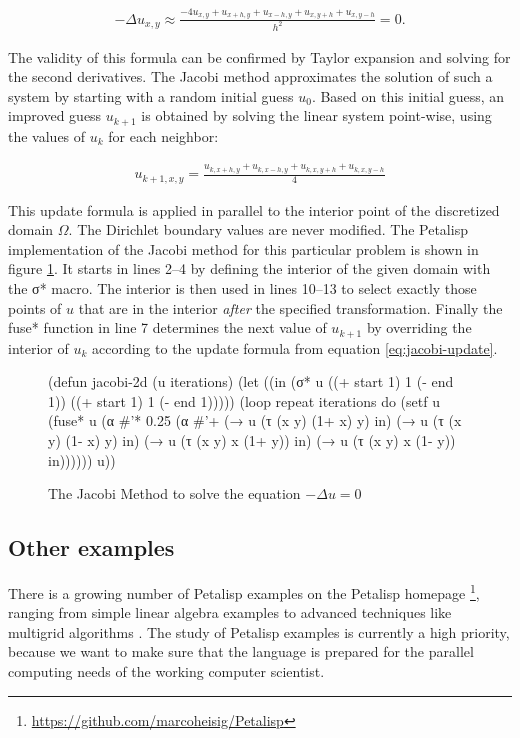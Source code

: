 \begin{align}
\label{eq:discretized-laplace}
- \Delta u_{x,y} \approx \frac{-4 u_{x,y} + u_{x+h,y} + u_{x-h,y} + u_{x,y+h} + u_{x,y-h}}{h^2} = 0.
\end{align}

\noindent The validity of this formula can be confirmed by Taylor expansion and
solving for the second derivatives. The Jacobi method approximates the
solution of such a system by starting with a random initial guess
$u_{0}$. Based on this initial guess, an improved guess $u_{k+1}$ is
obtained by solving the linear system point-wise, using the values of
$u_{k}$ for each neighbor:

\begin{align}
\label{eq:jacobi-update}
u_{k+1,x,y} = \frac{u_{k,x+h,y} + u_{k,x-h,y} + u_{k,x,y+h} + u_{k,x,y-h}}{4}
\end{align}

This update formula is applied in parallel to the interior point of the
discretized domain $\Omega$. The Dirichlet boundary values are never
modified. The Petalisp implementation of the Jacobi method for this
particular problem is shown in figure \ref{fig:Jacobi}. It starts in lines
2--4 by defining the interior of the given domain with the σ* macro. The
interior is then used in lines 10--13 to select exactly those points of $u$
that are in the interior \emph{after} the specified transformation. Finally
the fuse* function in line 7 determines the next value of $u_{k+1}$ by
overriding the interior of $u_{k}$ according to the update formula from
equation \ref{eq:jacobi-update}.

\begin{figure}[htb]
\resetlinenumber
\begin{code}
(defun jacobi-2d (u iterations)
 (let ((in
        (σ* u ((+ start 1) 1 (- end 1))
              ((+ start 1) 1 (- end 1)))))
   (loop repeat iterations do
     (setf u
       (fuse* u
        (α #'* 0.25
          (α #'+
             (→ u (τ (x y) (1+ x) y) in)
             (→ u (τ (x y) (1- x) y) in)
             (→ u (τ (x y) x (1+ y)) in)
             (→ u (τ (x y) x (1- y)) in))))))
   u))
\end{code}
\caption{The Jacobi Method to solve the equation $- \Delta u = 0$}
\label{fig:Jacobi}
\end{figure}

\subsection{Other examples}

There is a growing number of Petalisp examples on the Petalisp homepage
\footnote{\url{https://github.com/marcoheisig/Petalisp}}, ranging from
simple linear algebra examples to advanced techniques like multigrid
algorithms \cite{briggs2000}. The study of Petalisp examples is currently a
high priority, because we want to make sure that the language is prepared
for the parallel computing needs of the working computer scientist.
